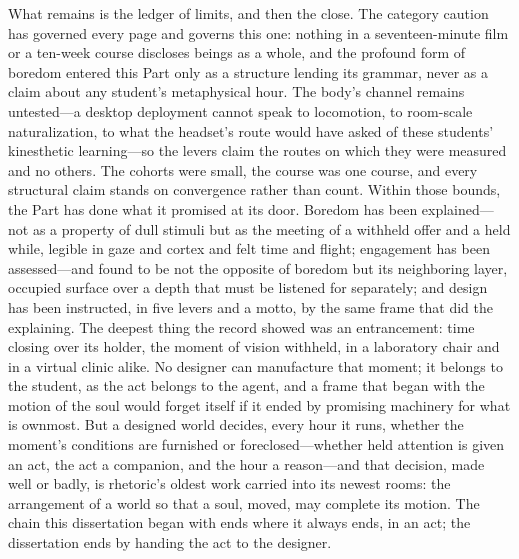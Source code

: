 What remains is the ledger of limits, and then the close. The category caution has governed every page and governs this one: nothing in a seventeen-minute film or a ten-week course discloses beings as a whole, and the profound form of boredom entered this Part only as a structure lending its grammar, never as a claim about any student's metaphysical hour. The body's channel remains untested---a desktop deployment cannot speak to locomotion, to room-scale naturalization, to what the headset's route would have asked of these students' kinesthetic learning---so the levers claim the routes on which they were measured and no others. The cohorts were small, the course was one course, and every structural claim stands on convergence rather than count. Within those bounds, the Part has done what it promised at its door. Boredom has been explained---not as a property of dull stimuli but as the meeting of a withheld offer and a held while, legible in gaze and cortex and felt time and flight; engagement has been assessed---and found to be not the opposite of boredom but its neighboring layer, occupied surface over a depth that must be listened for separately; and design has been instructed, in five levers and a motto, by the same frame that did the explaining. The deepest thing the record showed was an entrancement: time closing over its holder, the moment of vision withheld, in a laboratory chair and in a virtual clinic alike. No designer can manufacture that moment; it belongs to the student, as the act belongs to the agent, and a frame that began with the motion of the soul would forget itself if it ended by promising machinery for what is ownmost. But a designed world decides, every hour it runs, whether the moment's conditions are furnished or foreclosed---whether held attention is given an act, the act a companion, and the hour a reason---and that decision, made well or badly, is rhetoric's oldest work carried into its newest rooms: the arrangement of a world so that a soul, moved, may complete its motion. The chain this dissertation began with ends where it always ends, in an act; the dissertation ends by handing the act to the designer.


